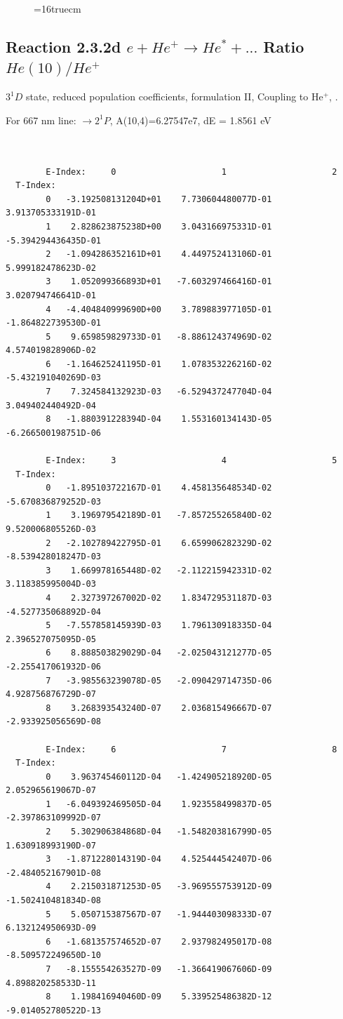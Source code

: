 \documentclass[12pt,dvips]{article}
\begin{document}
\begin{figure} \label{2.3.2c}
\epsfxsize=16truecm
\end{figure}
\newpage


\subsection{
  Reaction 2.3.2d $e + He^+ \rightarrow He^* + ... $ Ratio $He(10)/He^+$
}

  $3^1D$ state,
  reduced population coefficients, formulation II,
  Coupling to He$^+$, \cite{kn:Fujimoto}.

  For 667 nm line: $\rightarrow 2^1P$, A(10,4)=6.27547e7, dE = 1.8561 eV

\begin{small}\begin{verbatim}


        E-Index:     0                     1                     2
  T-Index:
        0   -3.192508131204D+01    7.730604480077D-01    3.913705333191D-01
        1    2.828623875238D+00    3.043166975331D-01   -5.394294436435D-01
        2   -1.094286352161D+01    4.449752413106D-01    5.999182478623D-02
        3    1.052099366893D+01   -7.603297466416D-01    3.020794746641D-01
        4   -4.404840999690D+00    3.789883977105D-01   -1.864822739530D-01
        5    9.659859829733D-01   -8.886124374969D-02    4.574019828906D-02
        6   -1.164625241195D-01    1.078353226216D-02   -5.432191040269D-03
        7    7.324584132923D-03   -6.529437247704D-04    3.049402440492D-04
        8   -1.880391228394D-04    1.553160134143D-05   -6.266500198751D-06

        E-Index:     3                     4                     5
  T-Index:
        0   -1.895103722167D-01    4.458135648534D-02   -5.670836879252D-03
        1    3.196979542189D-01   -7.857255265840D-02    9.520006805526D-03
        2   -2.102789422795D-01    6.659906282329D-02   -8.539428018247D-03
        3    1.669978165448D-02   -2.112215942331D-02    3.118385995004D-03
        4    2.327397267002D-02    1.834729531187D-03   -4.527735068892D-04
        5   -7.557858145939D-03    1.796130918335D-04    2.396527075095D-05
        6    8.888503829029D-04   -2.025043121277D-05   -2.255417061932D-06
        7   -3.985563239078D-05   -2.090429714735D-06    4.928756876729D-07
        8    3.268393543240D-07    2.036815496667D-07   -2.933925056569D-08

        E-Index:     6                     7                     8
  T-Index:
        0    3.963745460112D-04   -1.424905218920D-05    2.052965619067D-07
        1   -6.049392469505D-04    1.923558499837D-05   -2.397863109992D-07
        2    5.302906384868D-04   -1.548203816799D-05    1.630918993190D-07
        3   -1.871228014319D-04    4.525444542407D-06   -2.484052167901D-08
        4    2.215031871253D-05   -3.969555753912D-09   -1.502410481834D-08
        5    5.050715387567D-07   -1.944403098333D-07    6.132124950693D-09
        6   -1.681357574652D-07    2.937982495017D-08   -8.509572249650D-10
        7   -8.155554263527D-09   -1.366419067606D-09    4.898820258533D-11
        8    1.198416940460D-09    5.339525486382D-12   -9.014052780522D-13


\end{verbatim}
\end{small}
\end{document}
